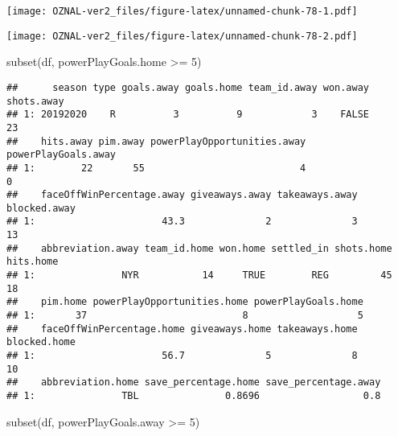 \documentclass[
]{article}
\newenvironment{Shaded}{\begin{snugshade}}{\end{snugshade}}
\newcommand{\AttributeTok}[1]{\textcolor[rgb]{0.77,0.63,0.00}{#1}}
\newcommand{\ConstantTok}[1]{\textcolor[rgb]{0.00,0.00,0.00}{#1}}
\newcommand{\DecValTok}[1]{\textcolor[rgb]{0.00,0.00,0.81}{#1}}
\newcommand{\FloatTok}[1]{\textcolor[rgb]{0.00,0.00,0.81}{#1}}
\newcommand{\FunctionTok}[1]{\textcolor[rgb]{0.00,0.00,0.00}{#1}}
\newcommand{\NormalTok}[1]{#1}
\newcommand{\SpecialCharTok}[1]{\textcolor[rgb]{0.00,0.00,0.00}{#1}}
\newcommand{\StringTok}[1]{\textcolor[rgb]{0.31,0.60,0.02}{#1}}
\begin{document}
\texttt{[image: OZNAL-ver2\_files/figure-latex/unnamed-chunk-78-1.pdf]}

\begin{Shaded}
\end{Shaded}

\texttt{[image: OZNAL-ver2\_files/figure-latex/unnamed-chunk-78-2.pdf]}

\begin{Shaded}
\begin{Highlighting}[]
\FunctionTok{subset}\NormalTok{(df, powerPlayGoals.home }\SpecialCharTok{\textgreater{}=} \DecValTok{5}\NormalTok{)}
\end{Highlighting}
\end{Shaded}

\begin{verbatim}
##      season type goals.away goals.home team_id.away won.away shots.away
## 1: 20192020    R          3          9            3    FALSE         23
##    hits.away pim.away powerPlayOpportunities.away powerPlayGoals.away
## 1:        22       55                           4                   0
##    faceOffWinPercentage.away giveaways.away takeaways.away blocked.away
## 1:                      43.3              2              3           13
##    abbreviation.away team_id.home won.home settled_in shots.home hits.home
## 1:               NYR           14     TRUE        REG         45        18
##    pim.home powerPlayOpportunities.home powerPlayGoals.home
## 1:       37                           8                   5
##    faceOffWinPercentage.home giveaways.home takeaways.home blocked.home
## 1:                      56.7              5              8           10
##    abbreviation.home save_percentage.home save_percentage.away
## 1:               TBL               0.8696                  0.8
\end{verbatim}

\begin{Shaded}
\begin{Highlighting}[]
\FunctionTok{subset}\NormalTok{(df, powerPlayGoals.away }\SpecialCharTok{\textgreater{}=} \DecValTok{5}\NormalTok{)}
\end{Highlighting}
\end{Shaded}
\end{document}
